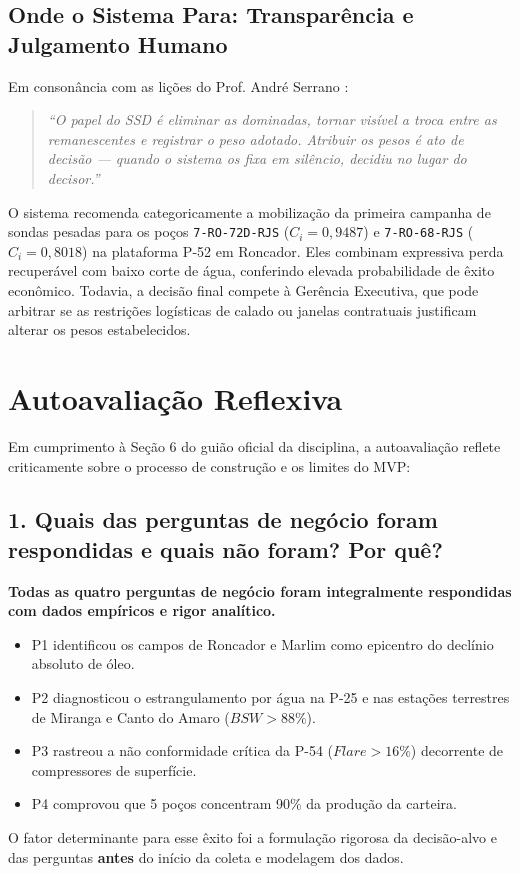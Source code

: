 \documentclass[12pt,a4paper]{article}
\begin{document}
\subsection{Onde o Sistema Para: Transparência e Julgamento Humano}
Em consonância com as lições do Prof. André Serrano \cite{serrano2026}:
\begin{quote}
    \textit{``O papel do SSD é eliminar as dominadas, tornar visível a troca entre as remanescentes e registrar o peso adotado. Atribuir os pesos é ato de decisão — quando o sistema os fixa em silêncio, decidiu no lugar do decisor.''}
\end{quote}
O sistema recomenda categoricamente a mobilização da primeira campanha de sondas pesadas para os poços \texttt{7-RO-72D-RJS} ($C_i = 0,9487$) e \texttt{7-RO-68-RJS} ($C_i = 0,8018$) na plataforma P-52 em Roncador. Eles combinam expressiva perda recuperável com baixo corte de água, conferindo elevada probabilidade de êxito econômico. Todavia, a decisão final compete à Gerência Executiva, que pode arbitrar se as restrições logísticas de calado ou janelas contratuais justificam alterar os pesos estabelecidos.

\section{Autoavaliação Reflexiva}

Em cumprimento à Seção 6 do guião oficial da disciplina, a autoavaliação reflete criticamente sobre o processo de construção e os limites do MVP:

\subsection{1. Quais das perguntas de negócio foram respondidas e quais não foram? Por quê?}
\textbf{Todas as quatro perguntas de negócio foram integralmente respondidas com dados empíricos e rigor analítico.} 
\begin{itemize}[leftmargin=*]
    \item P1 identificou os campos de Roncador e Marlim como epicentro do declínio absoluto de óleo.
    \item P2 diagnosticou o estrangulamento por água na P-25 e nas estações terrestres de Miranga e Canto do Amaro ($BSW > 88\%$).
    \item P3 rastreou a não conformidade crítica da P-54 ($Flare > 16\%$) decorrente de compressores de superfície.
    \item P4 comprovou que 5 poços concentram 90\% da produção da carteira.
\end{itemize}
O fator determinante para esse êxito foi a formulação rigorosa da decisão-alvo e das perguntas \textbf{antes} do início da coleta e modelagem dos dados.
\end{document}
